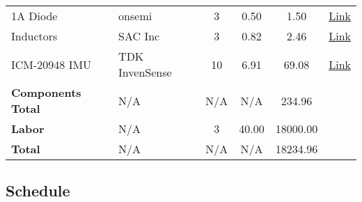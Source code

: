 \begin{table}[htbp]
\begin{tabular}{@{} l l S[table-format=1] S[table-format=2.2] S[table-format=5.2] l @{}}
    1A Diode            & onsemi               & 3                  & 0.50                & 1.50                & \href{https://tinyurl.com/2s4j6yfa}{Link} \\
    Inductors           & SAC Inc & 3          & 0.82               & 2.46                & \href{https://tinyurl.com/j4b4ezpv}{Link} \\
    ICM-20948 IMU       & TDK InvenSense       & 10                 & 6.91                & 69.08               & \href{https://tinyurl.com/m3rkp7xx}{Link} \\
    \addlinespace
    \textbf{Components Total} & {N/A} & {N/A} & {N/A} & 234.96 & \\
    \textbf{Labor}            & {N/A} & {3}    & {40.00} & 18000.00 & \\
    \midrule
    \textbf{Total}            & {N/A} & {N/A}  & {N/A} & 18234.96 & \\
    \bottomrule
    \end{tabular}
    \end{table}
\newpage
\subsection{Schedule}